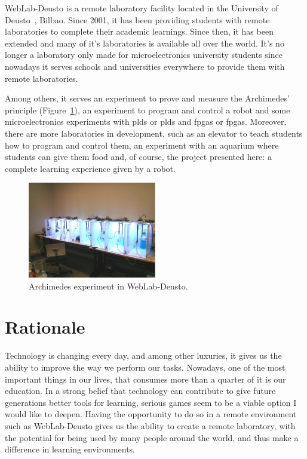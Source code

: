 WebLab-Deusto is a remote laboratory facility located in the University of Deusto~\cite{weblab},
Bilbao. Since 2001, it has been providing students with remote laboratories to complete their
academic learnings. Since then, it has been extended and many of it's laboratories is available
all over the world. It's no longer a laboratory only made for microelectronics university students
since nowadays it serves schools and universities everywhere to provide them with remote
laboratories.

Among others, it serves an experiment to prove and measure the Archimedes' principle
(Figure~\ref{fig:archimedes}), an experiment to program and control a robot and some
microelectronics experiments with \acrlong{pld}s or \acrshort{pld}s and \acrlong{fpga}s or
\acrshort{fpga}s. Moreover, there are more laboratories in development, such as an elevator to teach
students how to program and control them, an experiment with an aquarium where students can give
them food and, of course, the project presented here: a complete learning experience given by a
robot.

\begin{figure}[!htbp]
	\centering
	\includegraphics[width=0.5\textwidth]{fig/archimedes}
	\caption{Archimedes experiment in WebLab-Deusto.}\label{fig:archimedes}
\end{figure}

\section{Rationale}

Technology is changing every day, and among other luxuries, it gives us the ability to improve the
way we perform our tasks. Nowadays, one of the most important things in our lives, that consumes
more than a quarter of it is our education. In a strong belief that technology can contribute to
give future generations better tools for learning, serious games seem to be a viable option I would
like to deepen. Having the opportunity to do so in a remote environment such as WebLab-Deusto gives
us the ability to create a remote laboratory, with the potential for being used by many people
around the world, and thus make a difference in learning environments.
